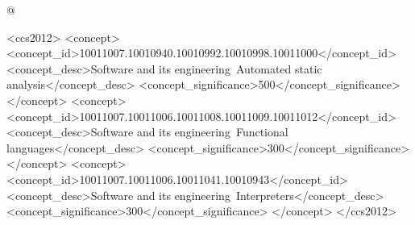 \documentclass[acmsmall, screen]{acmart}\settopmatter{}
\begin{document}

\lstMakeShortInline[keywordstyle=,%
                    flexiblecolumns=false,%
                    mathescape=false,%
                    basicstyle=\tt]@

\begin{abstract}
  
\end{abstract}


\begin{CCSXML}
<ccs2012>
<concept>
<concept_id>10011007.10010940.10010992.10010998.10011000</concept_id>
<concept_desc>Software and its engineering~Automated static analysis</concept_desc>
<concept_significance>500</concept_significance>
</concept>
<concept>
<concept_id>10011007.10011006.10011008.10011009.10011012</concept_id>
<concept_desc>Software and its engineering~Functional languages</concept_desc>
<concept_significance>300</concept_significance>
</concept>
<concept>
<concept_id>10011007.10011006.10011041.10010943</concept_id>
<concept_desc>Software and its engineering~Interpreters</concept_desc>
<concept_significance>300</concept_significance>
</concept>
</ccs2012>
\end{CCSXML}





\maketitle
\end{document}
